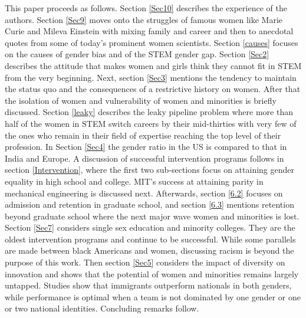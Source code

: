 \documentclass[utf8]{frontiersSCNS} %
\begin{document}
This paper proceeds as follows. Section \ref{Sec10} describes the experience of the authors. Section \ref{Sec9} moves onto the struggles of famous women like Marie Curie and Mileva Einstein with mixing family and career and then to anecdotal quotes from some of today's prominent women scientists. Section \ref{causes} focuses on the causes of gender bias and of the STEM gender gap. Section \ref{Sec2} describes the attitude that makes women and girls think they cannot fit in STEM from the very beginning. Next, section \ref{Sec3} mentions the tendency to maintain the status quo and the consequences of a restrictive history on women. After that the isolation of women and vulnerability of women and minorities is briefly discussed.  Section \ref{leaky} describes the leaky pipeline problem where more than half of the women in STEM switch careers by their mid-thirties with very few of the ones who remain in their field of expertise reaching the top level of their profession. In Section \ref{Sec4} the gender ratio in the US is compared to that in India and Europe. %
A discussion of successful intervention programs follows in section \ref{Intervention}, where the first two sub-sections focus on attaining gender equality in high school and college. MIT's success at attaining parity in mechanical engineering is discussed next. Afterwards, section \ref{6.2} focuses on admission and retention in graduate school, and section \ref{6.3} mentions retention beyond graduate school where the next major wave women and minorities is lost. Section \ref{Sec7} considers single sex education and minority colleges. They are the oldest intervention programs and continue to be successful. While some parallels are made between black Americans and women, discussing racism is beyond the purpose of this work. Then section \ref{Sec5} considers the impact of diversity on innovation and shows that the potential of women and minorities remains largely untapped. Studies show that immigrants outperform nationals in both genders, while performance is optimal when a team is not dominated by one gender or one or two national identities. Concluding remarks follow.
\end{document}
